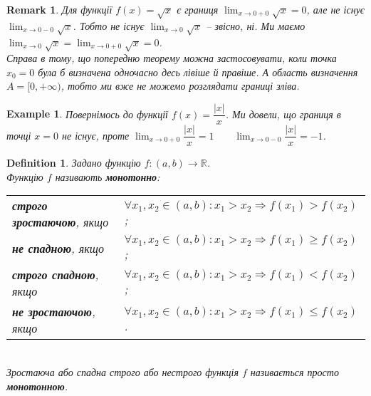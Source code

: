 \documentclass[a4paper, 14pt]{article}
\theoremstyle{theoremdd}
\theoremstyle{theoremdd}
\newtheorem{definition}[theorem]{Definition}
\theoremstyle{theoremdd}
\theoremstyle{theoremdd}
\newtheorem{example}[theorem]{Example}
\theoremstyle{theoremdd}
\theoremstyle{theoremdd}
\newtheorem{remark}[theorem]{Remark}
\theoremstyle{theoremdd}
\theoremstyle{theoremdd}
\begin{document}
\begin{remark}
Для функції $f(x) = \sqrt{x}$ є границя $\displaystyle\lim_{x \to 0+0} \sqrt{x} = 0$, але не існує $\displaystyle\lim_{x \to 0-0} \sqrt{x}$. Тобто не існує $\displaystyle\lim_{x \to 0} \sqrt{x}$ -- звісно, ні. Ми маємо $\displaystyle\lim_{x \to 0} \sqrt{x} = \lim_{x \to 0+0} \sqrt{x} = 0$.\\
Справа в тому, що попередню теорему можна застосовувати, коли точка $x_0 = 0$ була б визначена одночасно десь лівіше й правіше. А область визначення $A = [0,+\infty)$, тобто ми вже не можемо розглядати границі зліва.
\end{remark}

\begin{example}
Повернімось до функції $f(x) = \dfrac{|x|}{x}$. Ми довели, що границя в точці $x=0$ не існує, проте $\displaystyle\lim_{x \to 0+0} \dfrac{|x|}{x} = 1 \qquad \lim_{x \to 0-0} \dfrac{|x|}{x} = -1$.
\\ \iffalse %
\begin{figure} [H]
	\centering
	\begin{tikzpicture}
	\draw[thick, ->] (-2,0)--(2,0) node[anchor = north] {$x$};
	\draw[thick, ->] (0,-2)--(0,2.1) node[anchor = east] {$y$};
		\draw[thick, domain=0.01:2, variable=\x] plot({\x}, {1}) node[anchor = west] {$f(x) = \dfrac{|x|}{x}$};
		\draw[thick, domain=-2:-0.01, variable=\x] plot({\x}, {-1});
	
	\draw[fill = white](0,-1) circle(2pt);
	\draw[fill = white](0,1) circle(2pt);
	\draw[red,->] (-0.5,-1)--(-0.1,-1);
	\draw[red,->] (0.5,1)--(0.1,1);
	\end{tikzpicture}
\end{figure}
\fi %
\end{example}

\begin{definition}
Задано функцію $f \colon (a,b) \to \mathbb{R}$.\\
Функцію $f$ називають \textbf{монотонно}:\\
\begin{tabular}{ll}
\textbf{строго зростаючою}, якщо & $\forall x_1,x_2 \in (a,b): x_1 > x_2 \Rightarrow f(x_1)>f(x_2)$;\\
\textbf{не спадною}, якщо & $\forall x_1,x_2 \in (a,b): x_1 > x_2 \Rightarrow f(x_1) \geq f(x_2)$;\\
\textbf{строго спадною}, якщо & $\forall x_1,x_2 \in (a,b): x_1 > x_2 \Rightarrow f(x_1) < f(x_2)$;\\
\textbf{не зростаючою}, якщо & $\forall x_1,x_2 \in (a,b): x_1 > x_2 \Rightarrow f(x_1) \leq f(x_2)$.
\end{tabular}\\
Зростаюча або спадна строго або нестрого функція $f$ називається просто \textbf{монотонною}.
\end{definition}
\end{document}
